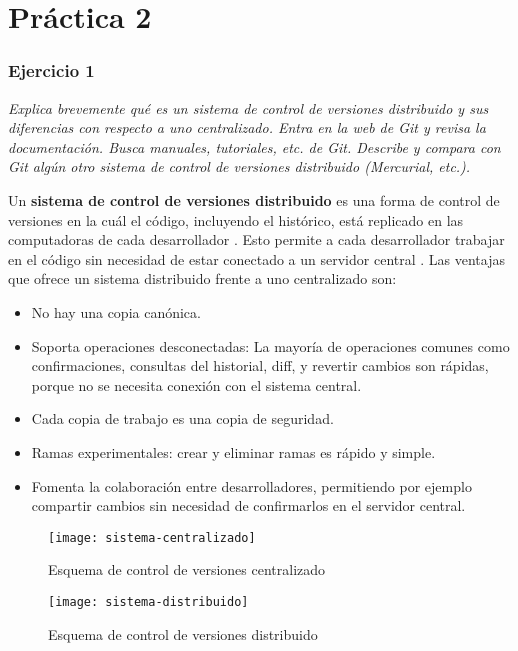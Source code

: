 \part{Práctica 2}
\section{Ejercicio 1}
\begin{center}
    \parbox{12cm}{\justify\textit{Explica brevemente qué es un sistema de control de versiones distribuido y sus diferencias con respecto a uno centralizado. Entra en la web de Git y revisa la documentación. Busca manuales, tutoriales, etc. de Git. Describe y compara con Git algún otro sistema de control de versiones distribuido (Mercurial, etc.).
    }}
\end{center}

Un \textbf{sistema de control de versiones distribuido} es una forma de control de versiones en la cuál el código, incluyendo el histórico, está replicado en las computadoras de cada desarrollador \cite{wikipedia_2020:Distributed_Version_Control}. Esto permite a cada desarrollador trabajar en el código sin necesidad de estar conectado a un servidor central \cite{juancarlosfernandez_2010}.
Las ventajas que ofrece un sistema distribuido frente a uno centralizado son:
\begin{itemize}
    \item No hay una copia canónica.
    \item Soporta operaciones desconectadas: La mayoría de operaciones comunes como confirmaciones, consultas del historial, diff, y revertir cambios son rápidas, porque no se necesita conexión con el sistema central.
    \item Cada copia de trabajo es una copia de seguridad.
    \item Ramas experimentales: crear y eliminar ramas es rápido y simple.
    \item Fomenta la colaboración entre desarrolladores, permitiendo por ejemplo compartir cambios sin necesidad de confirmarlos en el servidor central.
\end{itemize}

\begin{figure}[H]
    \centering
    \texttt{[image: sistema-centralizado]}
    \caption{Esquema de control de versiones centralizado}
    \label{fig:sistema-centralizado}
\end{figure}


\begin{figure}[H]
    \centering
    \texttt{[image: sistema-distribuido]}
    \caption{Esquema de control de versiones distribuido}
    \label{fig:sistema-distribuido}
\end{figure}


